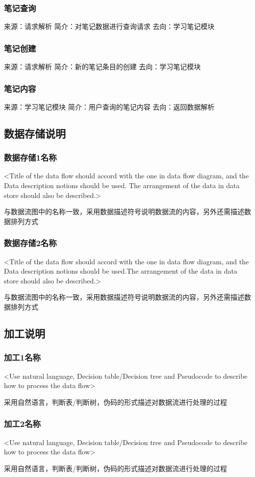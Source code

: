 \subsubsection{笔记查询}
来源：请求解析
简介：对笔记数据进行查询请求
去向：学习笔记模块

\subsubsection{笔记创建}
来源：请求解析
简介：新的笔记条目的创建
去向：学习笔记模块

\subsubsection{笔记内容}
来源：学习笔记模块
简介：用户查询的笔记内容
去向：返回数据解析

\subsection{数据存储说明}
\subsubsection{数据存储1名称}
<Title of  the data flow should accord with the one in data flow diagram, and the Data description notions should be used. The arrangement of the data in data store should also be described.>

与数据流图中的名称一致，采用数据描述符号说明数据流的内容，另外还需描述数据排列方式

\subsubsection{数据存储2名称}
<Title of  the data flow should accord with the one in data flow diagram, and the Data description notions should be used.The arrangement of the data in data store should also be described.>

与数据流图中的名称一致，采用数据描述符号说明数据流的内容，另外还需描述数据排列方式

\subsection{加工说明}
\subsubsection{加工1名称}
<Use natural language, Decision table/Decision tree and Pseudocode to describe how to process the data flow>

采用自然语言，判断表/判断树，伪码的形式描述对数据流进行处理的过程

\subsubsection{加工2名称}
<Use natural language, Decision table/Decision tree and Pseudocode to describe how to process the data flow>

采用自然语言，判断表/判断树，伪码的形式描述对数据流进行处理的过程
